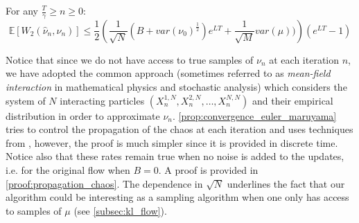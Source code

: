 \begin{theorem}\label{prop:convergence_euler_maruyama}
	For any $\frac{T}{\gamma}\geq n\geq 0$:
\[
\mathbb{E}[W_{2}(\hat{\nu}_{n},\nu_{n})]\leq \frac{1}{2}\left(\frac{1}{\sqrt{N}}(B+var(\nu_{0})^{\frac{1}{2}})e^{LT}+\frac{1}{\sqrt{M}}var(\mu))\right)(e^{LT}-1)
\]
\end{theorem}
Notice that since we do not have access to true samples of $\nu_n$ at each iteration $n$, we have adopted the common approach (sometimes referred to as \textit{mean-field interaction} in mathematical physics and stochastic analysis) which considers the system of  $N$ interacting particles $(X_n^{1,N}, X_n^{2,N}, \dots, X_n^{N,N})$ and their empirical distribution in order to approximate $\nu_n$.
\cref{prop:convergence_euler_maruyama} tries to control the propagation of the chaos at each iteration and uses techniques from \cite{Jourdain:2007}, however, the proof is much simpler since it is provided in discrete time. Notice also that these rates remain true when no noise is added to the updates, i.e. for the original flow when $B=0$. A proof is provided in \cref{proof:propagation_chaos}. The dependence in $\sqrt{N}$ underlines the fact that our algorithm could be interesting as a sampling algorithm when one only has access to samples of $\mu$ (see \cref{subsec:kl_flow}).

